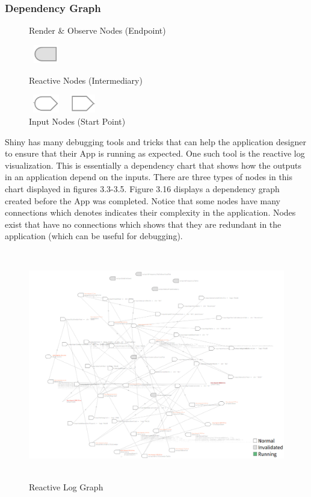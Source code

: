 \subsubsection{Dependency Graph}
\begin{figure}
	\vspace{-2em}
	\caption{Render \& Observe Nodes (Endpoint)\cite{shinyCheatSheet}}
	\includegraphics[height=0.8cm, width=1.5cm]{Images/ReactOutput.png}
	\caption{Reactive Nodes (Intermediary)\cite{shinyCheatSheet}}
	\includegraphics[height=0.8cm, width=1.5cm]{Images/MidPoint.png}
	\caption{Input Nodes (Start Point)\cite{shinyCheatSheet}}
	\includegraphics[height=0.8cm, width=1.5cm]{Images/InputNode.png}
\end{figure}  
Shiny has many debugging tools and tricks that can help the application designer to ensure that their App is running as expected. One such tool is the reactive log visualization. This is essentially a dependency chart that shows how the outputs in an application depend on the inputs. There are three types of nodes in this chart displayed in figures 3.3-3.5. Figure 3.16 displays a dependency graph created before the App was completed. Notice that some nodes have many connections which denotes indicates their complexity in the application. Nodes exist that have no connections which shows that they are redundant in the application (which can be useful for debugging).
\begin{figure}[h]
	\includegraphics[width=18cm, height=10cm]{Images/ReactLog.png}
	\caption{Reactive Log Graph}
\end{figure}

